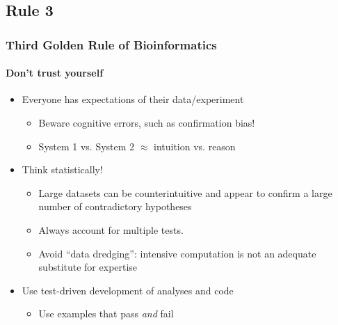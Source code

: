 %

\subsection{Rule 3}
\begin{frame}
  \frametitle{Third Golden Rule of Bioinformatics}
  \framesubtitle{Don't trust yourself}
  \begin{itemize}
    \item Everyone has expectations of their data/experiment
    \begin{itemize}
      \item Beware cognitive errors, such as confirmation bias!
      \item System 1 vs. System 2 $\approx$ intuition vs. reason
    \end{itemize}
    \item Think statistically! 
    \begin{itemize}
      \item Large datasets can be counterintuitive and appear to confirm a large number of contradictory hypotheses
      \item Always account for multiple tests.
      \item Avoid ``data dredging'': intensive computation is not an adequate substitute for expertise
    \end{itemize}
    \item Use test-driven development of analyses and code
    \begin{itemize}
      \item Use examples that pass \textit{and} fail
    \end{itemize}	  
  \end{itemize}
\end{frame}